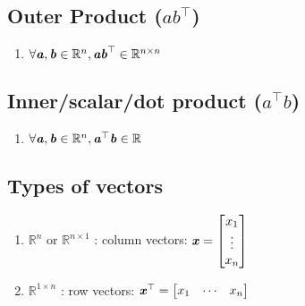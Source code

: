 \subsection{Outer Product ($ab^\top$) }

\begin{enumerate}
    \item $\forall \text{\textbf{\textit{a}}}, \text{\textbf{\textit{b}}} \in \mathbb{R}^n, \text{\textbf{\textit{ab}}}^\top \in \mathbb{R}^{n\times n}$
    \hfill \cite{mfml/book/mml/Deisenroth-Faisal-Ong}
    
\end{enumerate}



\subsection{Inner/scalar/dot product ($a^\top b$)}


\begin{enumerate}
    \item $\forall \text{\textbf{\textit{a}}}, \text{\textbf{\textit{b}}} \in \mathbb{R}^n, \text{\textbf{\textit{a}}}^\top \text{\textbf{\textit{b}}} \in \mathbb{R}$
    \hfill \cite{mfml/book/mml/Deisenroth-Faisal-Ong}
    
\end{enumerate}



\subsection{Types of vectors}

\begin{enumerate}
    \item $\mathbb{R}^n$ or $\mathbb{R}^{n\times 1}$ : column vectors: 
    $
        \text{\textbf{\textit{x}}} = 
        \begin{bmatrix}
            x_1\\ \vdots \\ x_n
        \end{bmatrix}
    $
    \hfill \cite{mfml/book/mml/Deisenroth-Faisal-Ong}

    \item $\mathbb{R}^{1\times n}$ : row vectors: 
    $
        \text{\textbf{\textit{x}}}^\top = \begin{bmatrix}x_1 & \cdots & x_n\end{bmatrix}
    $
    \hfill \cite{mfml/book/mml/Deisenroth-Faisal-Ong}
\end{enumerate}













